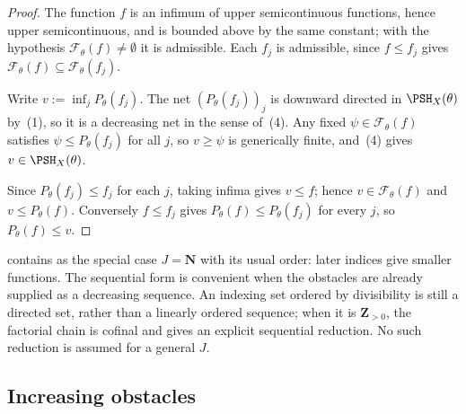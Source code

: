 \begin{proof}
The function $f$ is an infimum of upper semicontinuous functions, hence
upper semicontinuous, and is bounded above by the same constant; with the
hypothesis $\mathcal F_\theta(f)\ne\emptyset$ it is admissible.  Each $f_j$ is
admissible, since $f\le f_j$ gives
$\mathcal F_\theta(f)\subseteq\mathcal F_\theta(f_j)$.

Write $v:=\inf_jP_\theta(f_j)$.  The net $(P_\theta(f_j))_j$ is
downward directed in $\PSH_X(\theta)$ by
\,(1), so it is a decreasing net in
the sense of \,(4).  Any fixed
$\psi\in\mathcal F_\theta(f)$ satisfies $\psi\le P_\theta(f_j)$ for all $j$,
so $v\ge\psi$ is generically finite, and
\,(4) gives $v\in\PSH_X(\theta)$.

Since $P_\theta(f_j)\le f_j$ for each $j$, taking infima gives
$v\le f$; hence $v\in\mathcal F_\theta(f)$ and $v\le P_\theta(f)$.
Conversely $f\le f_j$ gives $P_\theta(f)\le P_\theta(f_j)$ for every
$j$, so $P_\theta(f)\le v$.
\end{proof}

\begin{remark}
\label{rem:ch45-nets-vs-sequences-obstacles}
 contains
 as the special case
$J=\mathbf N$ with its usual order: later indices give smaller functions.
The sequential form is convenient when the obstacles are already supplied
as a decreasing sequence.  An indexing set ordered by divisibility is still
a directed set, rather than a linearly ordered sequence; when it is
$\mathbf Z_{>0}$, the factorial chain is cofinal and gives an explicit
sequential reduction.  No such reduction is assumed for a general $J$.
\end{remark}

\subsection{Increasing obstacles}
\label{sec:ch45-increasing-obstacles}

